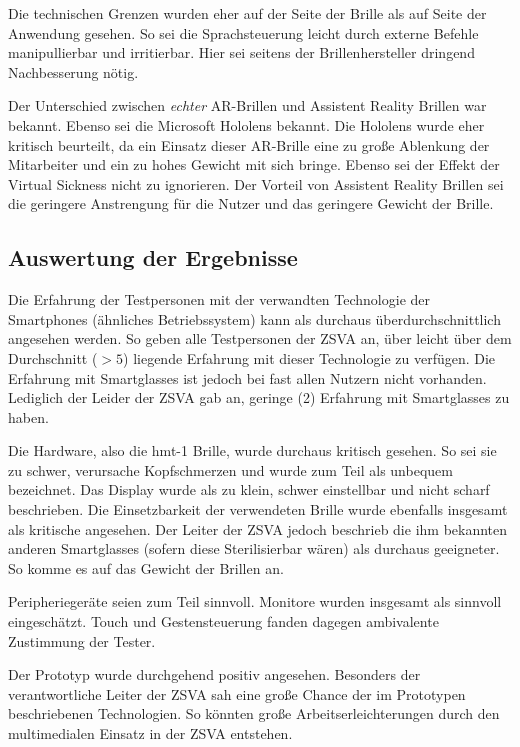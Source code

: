 Die technischen Grenzen wurden eher auf der Seite der Brille als auf Seite der Anwendung gesehen. So sei die Sprachsteuerung leicht durch externe Befehle manipullierbar und irritierbar. Hier sei seitens der Brillenhersteller dringend Nachbesserung nötig. 

Der Unterschied zwischen \emph{echter} AR-Brillen und Assistent Reality Brillen war bekannt. Ebenso sei die Microsoft Hololens bekannt. Die Hololens wurde eher kritisch beurteilt, da ein Einsatz dieser AR-Brille eine zu große Ablenkung der Mitarbeiter und ein zu hohes Gewicht mit sich bringe. Ebenso sei der Effekt der Virtual Sickness nicht zu ignorieren. Der Vorteil von Assistent Reality Brillen sei die geringere Anstrengung für die Nutzer und das geringere Gewicht der Brille.
%
%
%
%
\subsection{Auswertung der Ergebnisse}
\label{sec:Auswertung_der_Ergebnisse}
%
%
%
Die Erfahrung der Testpersonen mit der verwandten Technologie der Smartphones (ähnliches Betriebssystem) kann als durchaus überdurchschnittlich angesehen werden. So geben alle Testpersonen der ZSVA an, über leicht über dem Durchschnitt ($>5$) liegende Erfahrung mit dieser Technologie zu verfügen. Die Erfahrung mit Smartglasses ist jedoch bei fast allen Nutzern nicht vorhanden. Lediglich der Leider der ZSVA gab an, geringe (2) Erfahrung mit Smartglasses zu haben.

Die Hardware, also die hmt-1 Brille, wurde durchaus kritisch gesehen. So sei sie zu schwer, verursache Kopfschmerzen und wurde zum Teil als unbequem bezeichnet. Das Display wurde als zu klein, schwer einstellbar und nicht scharf beschrieben. Die Einsetzbarkeit der verwendeten Brille wurde ebenfalls insgesamt als kritische angesehen. Der Leiter der ZSVA jedoch beschrieb die ihm bekannten anderen Smartglasses (sofern diese Sterilisierbar wären) als durchaus geeigneter. So komme es auf das Gewicht der Brillen an. 

Peripheriegeräte seien zum Teil sinnvoll. Monitore wurden insgesamt als sinnvoll eingeschätzt. Touch und Gestensteuerung fanden dagegen ambivalente Zustimmung der Tester.

Der Prototyp wurde durchgehend positiv angesehen. Besonders der verantwortliche Leiter der ZSVA sah eine große Chance der im Prototypen beschriebenen Technologien. So könnten große Arbeitserleichterungen durch den multimedialen Einsatz in der ZSVA entstehen. 

